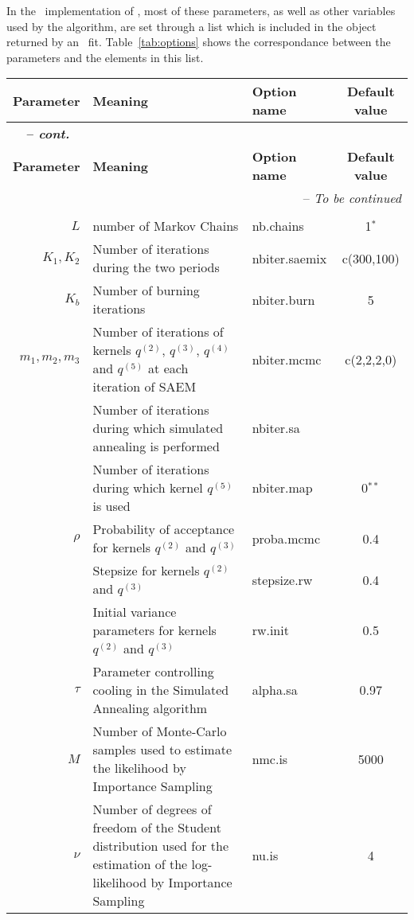 In the \R~implementation of \monolix, most of these parameters, as well as other variables used by the algorithm, are set through a list which is included in the object returned by an \monolix~fit. Table~\ref{tab:options} shows the correspondance between the parameters and the elements in this list.
\begin{center}
\begin{longtable}{r p{8cm} p{3cm} c}
\hline {\bf Parameter} & {\bf Meaning} & {\bf Option name} & {\bf Default value}\\
\hline
\endfirsthead
\multicolumn{4}{l}{{\itshape \bfseries \tablename\ \thetable{} -- cont.}} \\
\hline {\bf Parameter} & {\bf Meaning} & {\bf Option name} & {\bf Default value}\\
\hline
\endhead
\hline \multicolumn{4}{r}{{-- {\it To be continued}}} \\ 
\endfoot
\endlastfoot
& & \\
\hline
$L$ & number of Markov Chains & {\sf nb.chains} & 1$^*$ \\
$K_1, K_2$ & Number of iterations during the two periods & {\sf nbiter.saemix} & c(300,100)\\
$K_b$ & Number of burning iterations & {\sf nbiter.burn} & 5 \\
$m_1, m_2, m_3$ & Number of iterations of kernels $q^{(2)}$, $q^{(3)}$, $q^{(4)}$ and $q^{(5)}$ at each iteration of SAEM& {\sf nbiter.mcmc} & c(2,2,2,0)\\
 & Number of iterations during which simulated annealing is performed & {\sf nbiter.sa} &  \\
 & Number of iterations during which kernel $q^{(5)}$ is used & {\sf nbiter.map} &  0$^{**}$\\
$\rho$ & Probability of acceptance for kernels $q^{(2)}$ and $q^{(3)}$ & {\sf proba.mcmc} & 0.4 \\
 & Stepsize for kernels $q^{(2)}$ and $q^{(3)}$ & {\sf stepsize.rw} & 0.4 \\
 & Initial variance parameters for kernels $q^{(2)}$ and $q^{(3)}$ & {\sf rw.init} & 0.5\\
$\tau$ & Parameter controlling cooling in the Simulated Annealing algorithm & {\sf alpha.sa} & 0.97 \\
$M$ & Number of Monte-Carlo samples used to estimate the likelihood by Importance Sampling & {\sf nmc.is} & 5000 \\
$\nu$ & Number of degrees of freedom of the Student distribution used for the estimation of the log-likelihood by Importance Sampling & {\sf nu.is} & 4 \\

\end{longtable}
\end{center}
